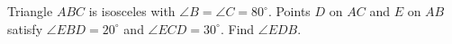 Triangle $ABC$ is isosceles with $\angle B=\angle C=80^\circ$. Points $D$ on $AC$ and $E$ on $AB$ satisfy $\angle EBD=20^\circ$ and $\angle ECD=30^\circ$. Find $\angle EDB$.
